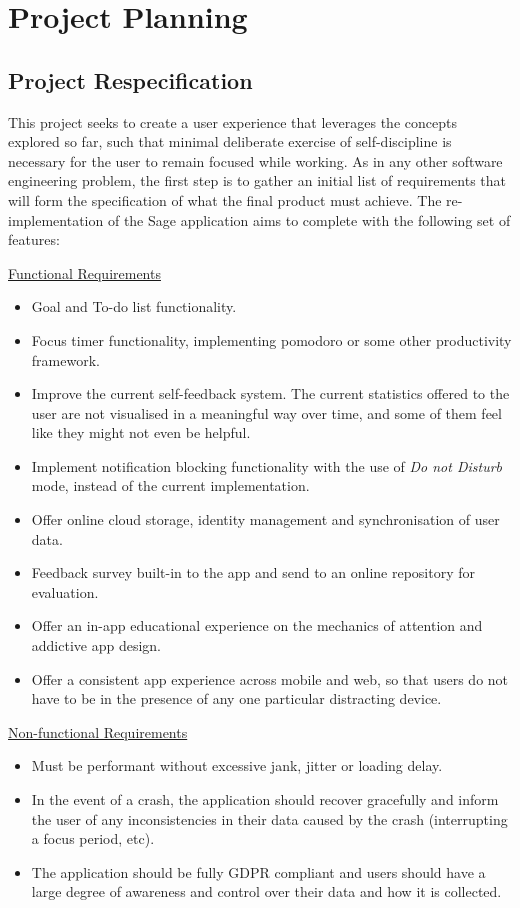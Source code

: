 \chapter{Project Planning}

\section{Project Respecification}
This project seeks to create a user experience that leverages the concepts explored so far, such that minimal deliberate exercise of self-discipline is necessary for the user to remain focused while working. As in any other software engineering problem, the first step is to gather an initial list of requirements that will form the specification of what the final product must achieve. The re-implementation of the Sage application aims to complete with the following set of features:

\underline{Functional Requirements}
\begin{itemize}
    \item Goal and To-do list functionality.
    \item Focus timer functionality, implementing pomodoro or some other productivity framework.
    \item Improve the current self-feedback system. The current statistics offered to the user are not visualised in a meaningful way over time, and some of them feel like they might not even be helpful.
    \item Implement notification blocking functionality with the use of \textit{Do not Disturb} mode, instead of the current implementation.
    \item Offer online cloud storage, identity management and synchronisation of user data.
    \item Feedback survey built-in to the app and send to an online repository for evaluation.
    \item Offer an in-app educational experience on the mechanics of attention and addictive app design.
    \item Offer a consistent app experience across mobile and web, so that users do not have to be in the presence of any one particular distracting device.
\end{itemize}

\underline{Non-functional Requirements}
\begin{itemize}
    \item Must be performant without excessive jank, jitter or loading delay.
    \item In the event of a crash, the application should recover gracefully and inform the user of any inconsistencies in their data caused by the crash (interrupting a focus period, etc).
    \item The application should be fully GDPR compliant and users should have a large degree of awareness and control over their data and how it is collected.
\end{itemize}

